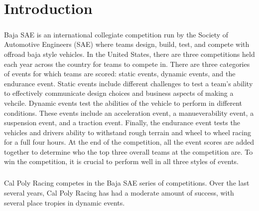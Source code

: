 \chapter{Introduction}

\paragraph{}
Baja SAE is an international collegiate competition run by the Society of Automotive Engineers (SAE) where teams design, build, test, and compete with offroad baja style vehicles.
In the United States, there are three competitions held each year across the country for teams to compete in. 
There are three categories of events for which teams are scored: static events, dynamic events, and the endurance event.  
Static events include different challenges to test a team's ability to effectively communicate design choices and business aspects of making a vehcile.  
Dynamic events test the abilities of the vehicle to perform in different conditions.  
These events include an acceleration event, a manueverability event, a suspension event, and a traction event.  
Finally, the endurance event tests the vehicles and drivers ability to withstand rough terrain and wheel to wheel racing for a full four hours.
At the end of the competition, all the event scores are added together to determine who the top three overall teams at the competition are.
To win the competition, it is crucial to perform well in all three styles of events.

\paragraph{}
Cal Poly Racing competes in the Baja SAE series of competitions.
Over the last several years, Cal Poly Racing has had a moderate amount of success, with several place tropies in dynamic events.
